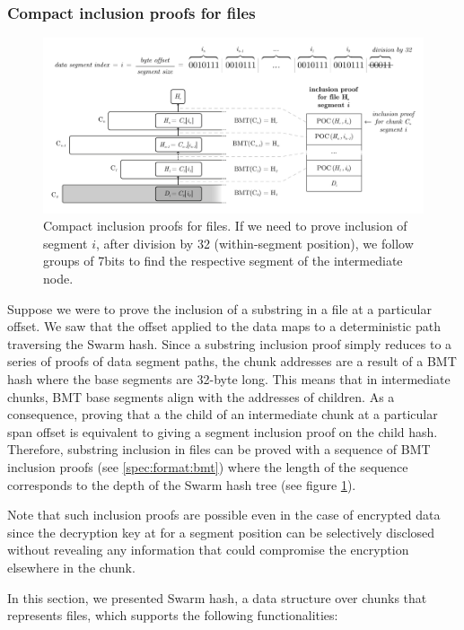 \subsubsection{Compact inclusion proofs for files}


\begin{figure}[htbp]
\centering
\includegraphics[width=\textwidth]{fig/file-inclusion.pdf}
\caption[Compact inclusion proofs for files \statusgreen]{Compact inclusion proofs for files. If we need to prove inclusion of segment   $i$, after division by 32 (within-segment position), we follow groups of 7bits to find the respective segment of the intermediate node.}
\label{fig:file-inclusion}
\end{figure}


Suppose we were to prove the inclusion of a substring in a file at a particular offset. We saw that the offset applied to the data maps to a deterministic path traversing the Swarm hash. Since a substring inclusion proof simply reduces to a series of proofs of data segment paths, the chunk addresses are a result of a BMT hash where the base segments are 32-byte long. This means that in intermediate chunks, BMT base segments align with the addresses of children. As a consequence, proving that a the child of an intermediate chunk at a particular span offset is equivalent to giving a segment inclusion proof on the child hash. Therefore, substring inclusion in files can be proved with a sequence of BMT inclusion proofs (see \ref{spec:format:bmt}) where the length of the sequence corresponds to the depth of the Swarm hash tree (see figure \ref{fig:file-inclusion}). 


Note that such inclusion proofs are possible even in the case of encrypted data since the decryption key at for a segment position can be selectively disclosed without revealing any information that could compromise the encryption elsewhere in the chunk.

In this section, we presented Swarm hash, a data structure over chunks that represents files, which supports the following functionalities:

